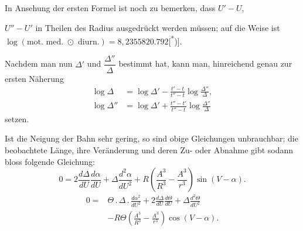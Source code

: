 In Ansehung der ersten Formel ist noch zu bemerken, dass $U'-U$,
\par\clearpage
{}
\begingroup\raggedright\noindent $U''-U'$ in Theilen des Radius ausgedrückt werden müssen; auf die Weise ist $\log(\text{mot. med. }\odot\text{ diurn.})=8{,}2355820.792$\textup{[\textsuperscript{*})]}.\par\endgroup
\begingroup\renewcommand{\thefootnote}{}\endgroup

Nachdem man nun $\Delta'$ und $\dfrac{\Delta''}{\Delta}$ bestimmt hat, kann man, hinreichend genau zur ersten Näherung
\[
\begin{aligned}
\log\Delta&=\log\Delta'-\frac{t'-t}{t''-t}\log\frac{\Delta''}{\Delta},\\
\log\Delta''&=\log\Delta'+\frac{t''-t'}{t''-t}\log\frac{\Delta''}{\Delta}
\end{aligned}
\]
\noindent setzen.

Ist die Neigung der Bahn sehr gering, so sind obige Gleichungen unbrauchbar; die beobachtete Länge, ihre Veränderung und deren Zu- oder Abnahme gibt sodann bloss folgende Gleichung:
\begin{equation}
0=2\frac{d\Delta}{dU}\frac{d\alpha}{dU}+\Delta\frac{d^2\alpha}{dU^2}
+R\left(\frac{A^3}{R^3}-\frac{A^3}{r^3}\right)\sin(V-\alpha).
\tag*{[c.]}
\end{equation}
\begin{equation}
\begin{aligned}
0={}&\Theta\mathbin{.}\Delta\mathbin{.}\frac{d\alpha^2}{dU^2}
+2\frac{d\Delta}{dU}\frac{d\Theta}{dU}+\Delta\frac{d^2\Theta}{dU^2}\\
&-R\Theta\left(\frac{A^3}{R^3}-\frac{A^3}{r^3}\right)\cos(V-\alpha).
\end{aligned}\tag*{[d.]}
\end{equation}
\clearpage\endgroup
